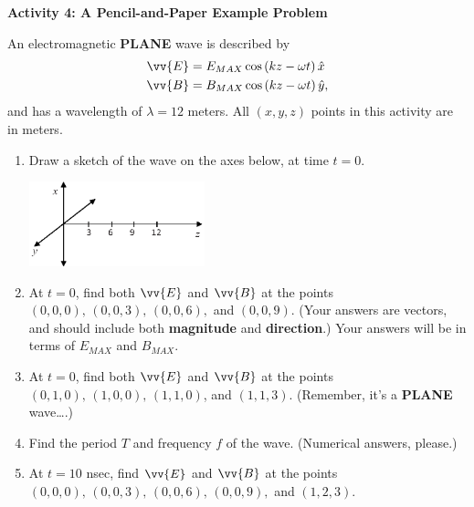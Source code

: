 \textbf{Activity 4: A Pencil-and-Paper Example Problem}

An electromagnetic \textbf{PLANE} wave is described by
\begin{align*}
\vv {E} &= E_{MAX} \cos \left ( kz - \omega t \right ) \hat x\\
\vv {B} &= B_{MAX} \cos \left ( kz - \omega t \right ) \hat y,
\end{align*}
and has a wavelength of $\lambda =12$ meters.  All $(x,y,z)$ points in this activity are in meters.

\begin{enumerate}[labparts]
\item Draw a sketch of the wave on the axes below, at time $t=0$.
\begin{center}
\includegraphics[width=0.4\textwidth]{plane_waves/em_waves_axes.eps}
\end{center}

\item At $t=0$, find both $\vv {E}$ and $\vv {B}$ at the points $(0,0,0), \,(0,0,3), \,(0,0,6),$ and $(0,0,9)$.  (Your answers are vectors, and should include both \textbf{magnitude} and \textbf{direction}.)  Your answers will be in terms of
$E_{MAX}$ and $B_{MAX}$.
\vspace{1.0in}

\item At $t=0$, find both $\vv {E}$ and $\vv {B}$ at the points $(0,1,0), \,(1,0,0), \,(1,1,0)$, and $(1,1,3)$.  (Remember, it's a \textbf{PLANE} wave….)
\vspace{1.0in}

\item Find the period $T$ and frequency $f$ of the wave.  (Numerical answers, please.)
\vspace{1.0in}

\item At $t=10$ nsec, find $\vv {E}$ and $\vv {B}$ at the points $(0,0,0), \,(0,0,3), \,(0,0,6), \,(0,0,9),$ and $(1,2,3)$.  
\vspace{1.0in}
\end{enumerate}


